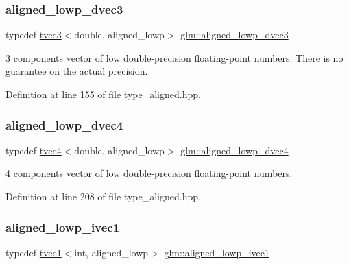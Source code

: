 \subsubsection{\texorpdfstring{aligned\_lowp\_dvec3}{aligned\_lowp\_dvec3}}
{\footnotesize\ttfamily typedef \mbox{\hyperlink{structglm_1_1tvec3}{tvec3}}$<$double, aligned\+\_\+lowp$>$ \mbox{\hyperlink{group__gtc__type__aligned_ga858a0e5240ebf37327c00aa040e5ed42}{glm\+::aligned\+\_\+lowp\+\_\+dvec3}}}

3 components vector of low double-\/precision floating-\/point numbers. There is no guarantee on the actual precision. 

Definition at line 155 of file type\+\_\+aligned.\+hpp.

\mbox{\label{group__gtc__type__aligned_ga9fc744c166048040931a89a30f282674}} 
\subsubsection{\texorpdfstring{aligned\_lowp\_dvec4}{aligned\_lowp\_dvec4}}
{\footnotesize\ttfamily typedef \mbox{\hyperlink{structglm_1_1tvec4}{tvec4}}$<$double, aligned\+\_\+lowp$>$ \mbox{\hyperlink{group__gtc__type__aligned_ga9fc744c166048040931a89a30f282674}{glm\+::aligned\+\_\+lowp\+\_\+dvec4}}}



4 components vector of low double-\/precision floating-\/point numbers. 



Definition at line 208 of file type\+\_\+aligned.\+hpp.

\mbox{\label{group__gtc__type__aligned_ga3688074e5264a94d6671a6218fd2e6a4}} 
\subsubsection{\texorpdfstring{aligned\_lowp\_ivec1}{aligned\_lowp\_ivec1}}
{\footnotesize\ttfamily typedef \mbox{\hyperlink{structglm_1_1tvec1}{tvec1}}$<$int, aligned\+\_\+lowp$>$ \mbox{\hyperlink{group__gtc__type__aligned_ga3688074e5264a94d6671a6218fd2e6a4}{glm\+::aligned\+\_\+lowp\+\_\+ivec1}}}



